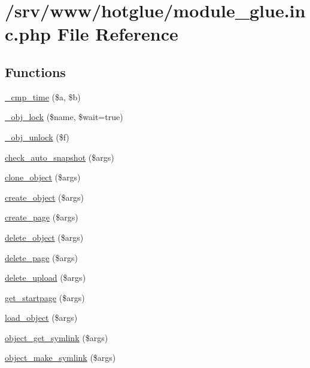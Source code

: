\hypertarget{module__glue_8inc_8php}{
\section{/srv/www/hotglue/module\_\-glue.inc.php File Reference}
\label{module__glue_8inc_8php}
}
\subsection*{Functions}
\begin{DoxyCompactItemize}
\item 
\hyperlink{module__glue_8inc_8php_a5fea6c120a24a298149febcbf3b1df10}{\_\-cmp\_\-time} (\$a, \$b)
\item 
\hyperlink{module__glue_8inc_8php_a21f260355b875069ca90edf1f9a559d0}{\_\-obj\_\-lock} (\$name, \$wait=true)
\item 
\hyperlink{module__glue_8inc_8php_a73a91facde5362e20df9657d31c2bb06}{\_\-obj\_\-unlock} (\$f)
\item 
\hyperlink{module__glue_8inc_8php_aaa1103a091b9dbca790e77d25a452ca5}{check\_\-auto\_\-snapshot} (\$args)
\item 
\hyperlink{module__glue_8inc_8php_a9c7f39d87787ce288ce3d8a3e389ba95}{clone\_\-object} (\$args)
\item 
\hyperlink{module__glue_8inc_8php_a12aa18f28f86274d770ba90aa88e2c3e}{create\_\-object} (\$args)
\item 
\hyperlink{module__glue_8inc_8php_a9806cd2a9b829a24876b149753e819fb}{create\_\-page} (\$args)
\item 
\hyperlink{module__glue_8inc_8php_a51fdb1d1ff829d6d2d79a9f852b7e0ef}{delete\_\-object} (\$args)
\item 
\hyperlink{module__glue_8inc_8php_af11541a6869804225793b82e54fa09fe}{delete\_\-page} (\$args)
\item 
\hyperlink{module__glue_8inc_8php_aa4865d52ac449f8aaadb3a5d425f2efb}{delete\_\-upload} (\$args)
\item 
\hyperlink{module__glue_8inc_8php_a5dd5e5f68b79a78901c25ce850b3eacf}{get\_\-startpage} (\$args)
\item 
\hyperlink{module__glue_8inc_8php_ac6b5ed5ff055ccb4d07ad17cf78d5a11}{load\_\-object} (\$args)
\item 
\hyperlink{module__glue_8inc_8php_aa9618d306b7ee5bd9e5d6a0be268ed44}{object\_\-get\_\-symlink} (\$args)
\item 
\hyperlink{module__glue_8inc_8php_a14e6da411df5aa9ff38e2d4ea27dd077}{object\_\-make\_\-symlink} (\$args)

\end{DoxyCompactItemize}
